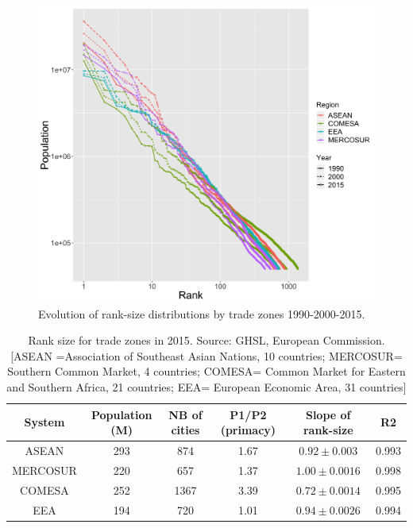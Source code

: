 \documentclass[11pt]{article}
\begin{document}
\begin{figure}
\centering
\includegraphics[width=\textwidth]{Fig2.png}
\caption{Evolution of rank-size distributions by trade zones 1990-2000-2015.\label{fig:fig2}}
\end{figure}   


\begin{table}
\caption{Rank size for trade zones in 2015. Source: GHSL, European Commission. [ASEAN =Association of Southeast Asian Nations, 10 countries; MERCOSUR= Southern Common Market, 4 countries; COMESA= Common Market for Eastern and Southern Africa, 21 countries; EEA= European Economic Area, 31 countries]\label{tab:tab3}}
\centering
\begin{tabular}{cccccc}
\toprule
System & Population (M) & NB of cities & P1/P2 (primacy) & Slope of rank-size & R2 \\
\midrule
ASEAN & 293 & 874 & 1.67 & $0.92 \pm 0.003$ & 0.993 \\
MERCOSUR & 220 & 657 & 1.37 & $1.00 \pm 0.0016$ & 0.998 \\
COMESA & 252 & 1367 & 3.39 & $0.72 \pm 0.0014$ & 0.995 \\
EEA & 194 & 720 & 1.01 & $0.94 \pm 0.0026$ & 0.994 \\ 
\bottomrule
\end{tabular}
\end{table}
\end{document}
